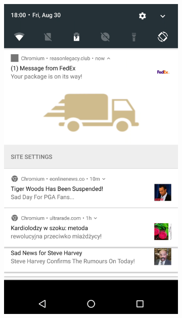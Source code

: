 \begin{figure}[h]
\begin{center}
    \begin{subfigure}{.2\textwidth} 
    \begin{center}
        \includegraphics[width=\linewidth]{figs/mobile_disguised_2}
        \caption{}
    \end{center}
    \end{subfigure}
    \begin{subfigure}{.2\textwidth} 

\end{subfigure}
\end{center}
\end{figure}
